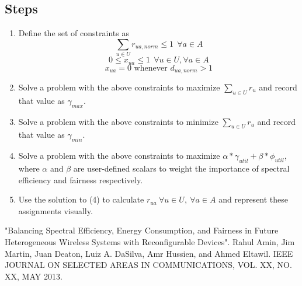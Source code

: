 \documentclass[11pt]{article}
\begin{document}
\subsection{Steps}
\begin{enumerate}
\item Define the set of constraints as 
\begin{equation} \label{eq1}
\sum_{u \in U} r_{ua,norm} \leq 1 \ \ \forall a \in A
\end{equation}
\begin{equation}
0 \leq x_{ua} \leq 1 \ \ \forall u \in U, \forall a \in A
\end{equation}
\begin{equation}
x_{ua} = 0 \text{ whenever } d_{ua,norm} > 1
\end{equation}
\item Solve a problem with the above constraints to maximize $\sum_{u \in U} r_u$ and record that value as $\gamma_{max}$.
\item Solve a problem with the above constraints to minimize $\sum_{u \in U} r_u$ and record that value as $\gamma_{min}$.
\item Solve a problem with the above constraints to maximize $\alpha * \gamma_{util} + \beta * \phi_{util}$, where $\alpha$ and $\beta$ are user-defined scalars to weight the importance of spectral efficiency and fairness respectively.
\item Use the solution to (4) to calculate $r_{ua} \ \forall u \in U, \ \forall a \in A$ and represent these assignments visually.
\end{enumerate}

\begin{thebibliography}{9} 
"Balancing Spectral Efficiency, Energy Consumption,
and Fairness in Future Heterogeneous Wireless
Systems with Reconfigurable Devices". Rahul Amin, Jim Martin, Juan Deaton, Luiz A. DaSilva, Amr Hussien, and Ahmed Eltawil. IEEE JOURNAL ON SELECTED AREAS IN COMMUNICATIONS, VOL. XX, NO. XX, MAY 2013.
\end{thebibliography}
\end{document}
